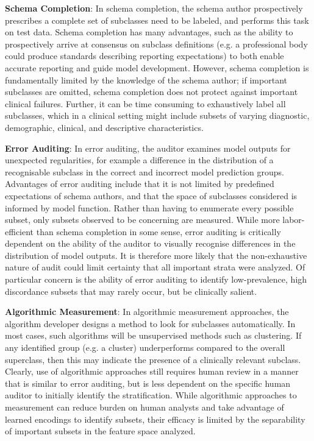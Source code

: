 \documentclass{article}
\begin{document}
\textbf{Schema Completion}: In schema completion, the schema author prospectively prescribes a complete set of subclasses need to be labeled, and performs this task on test data. 
Schema completion has many advantages, such as the ability to prospectively arrive at consensus on subclass definitions (e.g. a professional body could produce standards describing reporting expectations) to both enable accurate reporting and guide model development.
However, schema completion is fundamentally limited by the knowledge of the schema author; if important subclasses are omitted, schema completion does not protect against important clinical failures.
Further, it can be time consuming to exhaustively label all subclasses, which in a clinical setting might include subsets of varying diagnostic, demographic, clinical, and descriptive characteristics.

\textbf{Error Auditing}: In error auditing, the auditor examines model outputs for unexpected regularities, for example a difference in the distribution of a recognisable subclass in the correct and incorrect model prediction groups. 
Advantages of error auditing include that it is not limited by predefined expectations of schema authors, and that the space of subclasses considered is informed by model function.
Rather than having to enumerate every possible subset, only subsets observed to be concerning are measured.
While more labor-efficient than schema completion in some sense, error auditing is critically dependent on the ability of the auditor to visually recognise differences in the distribution of model outputs.
It is therefore more likely that the non-exhaustive nature of audit could limit certainty that all important strata were analyzed.
Of particular concern is the ability of error auditing to identify low-prevalence, high discordance subsets that may rarely occur, but be clinically salient.

\textbf{Algorithmic Measurement}: In algorithmic measurement approaches, the algorithm developer designs a method to look for subclasses automatically. 
In most cases, such algorithms will be unsupervised methods such as clustering. 
If any identified group (e.g. a cluster) underperforms compared to the overall superclass, then this may indicate the presence of a clinically relevant subclass.
Clearly, use of algorithmic approaches still requires human review in a manner that is similar to error auditing, but is less dependent on the specific human auditor to initially identify the stratification.  
While algorithmic approaches to measurement can reduce burden on human analysts and take advantage of learned encodings to identify subsets, their efficacy is limited by the separability of important subsets in the feature space analyzed.
\end{document}

